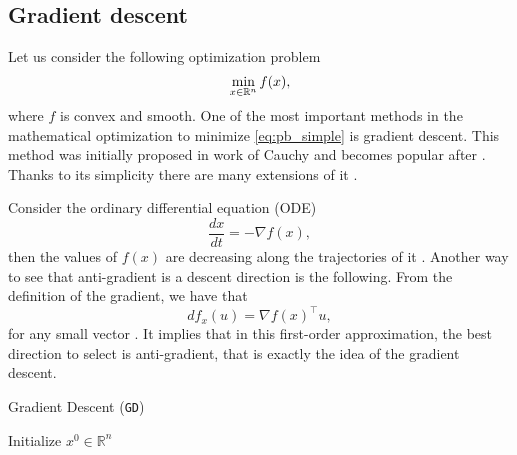 \subsection{Gradient descent}\label{sec:basics_gd}
Let us consider the following optimization problem
\begin{equation}\label{eq:pb_simple}
    \min_{x\in\mathbb{R}^n}f(x),
\end{equation}
where $f$ is convex and smooth. One of the most important methods in the mathematical optimization to minimize \eqref{eq:pb_simple} is gradient descent. This method was initially proposed in work of Cauchy \cite[Extrait $383$]{cauchy1847methode} and becomes popular after \cite{polyak1963gradient}. Thanks to its simplicity there are many extensions of it \cite{polyak1969minimization, polyak1969conjugate, nesterov2005smooth, beck2009fast}.

Consider the ordinary differential equation (ODE)
$$
\frac{d x}{d t} = -\nabla f(x),
$$
then the values of $f(x)$ are decreasing along the trajectories of it \cite{cauchy1847methode}. Another way to see that anti-gradient is a descent direction is the following. From the definition of the gradient, we have that
$$
df_x(u) = \nabla f(x)^\top u,
$$
for any small vector . It implies that in this first-order approximation, the best direction to select is anti-gradient, that is exactly the idea of the gradient descent.

\begin{algorithm}
    \caption{Gradient Descent (\texttt{GD})}
    \label{algo:gd}
    \begin{algorithmic}
        \STATE Initialize $x^0\in\mathbb{R}^n$
        \ENDFOR
    \end{algorithmic}
\end{algorithm}

